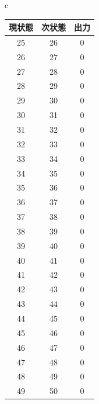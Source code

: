 \documentclass[a4paper]{jarticle}
\begin{document}
\begin{table}[!h]
\begin{center}
\begin{tabular}{c}
\begin{minipage}{0.5\hsize}
\begin{center}
\begin{tabular}{|c|c|c|}
					\hline
					現状態	&次状態	&出力\\	\hline\hline
					25	&26	&0\\	\hline
					26	&27	&0\\	\hline
					27	&28	&0\\	\hline
					28	&29	&0\\	\hline
					29	&30	&0\\	\hline
					30	&31	&0\\	\hline
					31	&32	&0\\	\hline
					32	&33	&0\\	\hline
					33	&34	&0\\	\hline
					34	&35	&0\\	\hline
					35	&36	&0\\	\hline
					36	&37	&0\\	\hline
					37	&38	&0\\	\hline
					38	&39	&0\\	\hline
					39	&40	&0\\	\hline
					40	&41	&0\\	\hline
					41	&42	&0\\	\hline
					42	&43	&0\\	\hline
					43	&44	&0\\	\hline
					44	&45	&0\\	\hline
					45	&46	&0\\	\hline
					46	&47	&0\\	\hline
					47	&48	&0\\	\hline
					48	&49	&0\\	\hline
					49	&50	&0\\	\hline
					\end{tabular}
				\end{center}
			\end{minipage}
		\end{tabular}
	\end{center}
\end{table}
\end{document}
